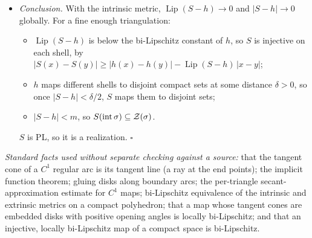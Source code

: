 \begin{itemize}
\begin{itemize}
  So $\operatorname{Lip}(S-h)\le C\,\omega(\phi',\mathrm{mesh})\to0$.
  \end{itemize}
  This uses only that $\phi$ is $C^1$ on each link segment; no curvature of $\lambda_v$ is needed.
\item \emph{Conclusion.} With the intrinsic metric, $\operatorname{Lip}(S-h)\to0$ and $|S-h|\to0$ globally. For a fine
enough triangulation:
  \begin{itemize}
  \item $\operatorname{Lip}(S-h)$ is below the bi-Lipschitz constant of $h$, so $S$ is injective on each shell, by
  $|S(x)-S(y)|\ge|h(x)-h(y)|-\operatorname{Lip}(S-h)\,|x-y|$;
  \item $h$ maps different shells to disjoint compact sets at some distance $\delta>0$, so once $|S-h|<\delta/2$,
  $S$ maps them to disjoint sets;
  \item $|S-h|<m$, so $S(\operatorname{int}\sigma)\subseteq\mathcal{Z}(\sigma)$.
  \end{itemize}
  $S$ is PL, so it is a realization. $\square$
\end{itemize}

\emph{Standard facts used without separate checking against a source:} that the tangent cone of a $C^1$ regular arc
is its tangent line (a ray at the end points); the implicit function theorem; gluing disks along boundary arcs; the per-triangle
secant-approximation estimate for $C^1$ maps; bi-Lipschitz equivalence of the intrinsic and extrinsic metrics on a
compact polyhedron; that a map whose tangent cones are embedded disks with positive opening angles is locally
bi-Lipschitz; and that an injective, locally bi-Lipschitz map of a compact space is bi-Lipschitz.
